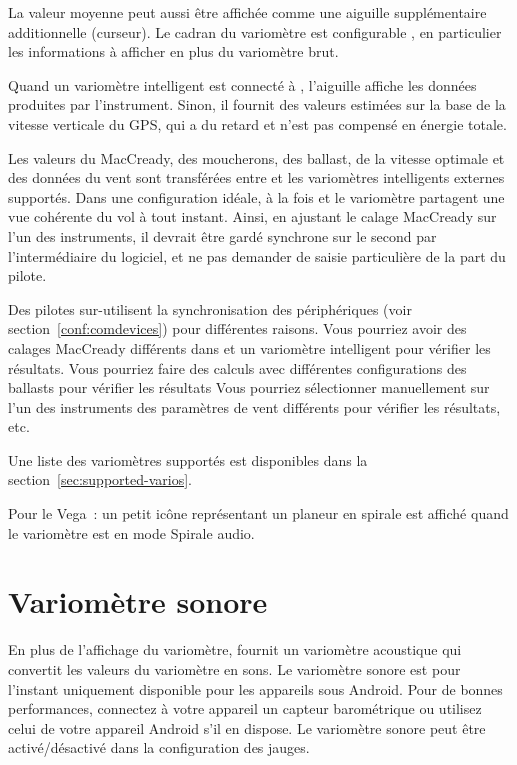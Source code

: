 La valeur moyenne peut aussi être affichée comme une aiguille supplémentaire additionnelle (curseur).
Le cadran du variomètre est configurable , en particulier les informations à afficher en plus du variomètre brut.

Quand un variomètre intelligent est connecté à \xc, l'aiguille affiche les données produites par l'instrument.
Sinon, il fournit des valeurs estimées sur la base de la vitesse verticale du GPS, qui a du retard et n'est pas compensé en énergie totale.

Les valeurs du MacCready, des moucherons, des ballast, de la vitesse optimale et des données du vent sont transférées entre \xc{} et les variomètres intelligents externes supportés.
Dans une configuration idéale, à la fois \xc{} et le variomètre partagent une vue cohérente du vol à tout instant. Ainsi, en ajustant le calage MacCready sur l'un des instruments, il devrait être gardé synchrone sur le second par l'intermédiaire du logiciel, et ne pas demander de saisie particulière de la part du pilote.

Des pilotes sur-utilisent la synchronisation des périphériques (voir section~\ref{conf:comdevices}) pour différentes raisons.
Vous pourriez avoir des calages MacCready différents dans \xc{} et un variomètre intelligent pour vérifier les résultats.
Vous pourriez faire des calculs avec différentes configurations des ballasts pour vérifier les résultats
Vous pourriez sélectionner manuellement sur l'un des instruments des paramètres de vent différents pour vérifier les résultats, etc.

Une liste des variomètres supportés est disponibles dans la section~\ref{sec:supported-varios}.

Pour le Vega~: un petit icône représentant un planeur en spirale est affiché quand le variomètre est en mode Spirale audio.

\section{Variomètre sonore}

En plus de l'affichage du variomètre, \xc{} fournit un variomètre acoustique qui convertit les valeurs du variomètre en sons. Le variomètre sonore est pour l'instant uniquement disponible pour les appareils sous Android.
Pour de bonnes performances, connectez à votre appareil un capteur barométrique ou utilisez celui de votre appareil Android s'il en dispose. 
Le variomètre sonore peut être activé/désactivé dans la configuration des jauges.


